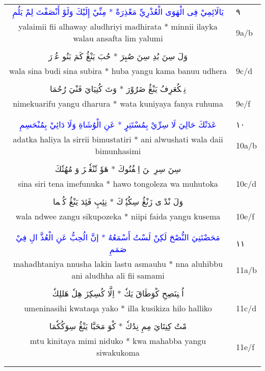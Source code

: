 \documentclass[a4paper, 10pt]{report}
\begin{document}
\begin{longtable}{cl} 

\textcolor{blue}{\textarabic{يَالَائِمِيْ فِى الْهَوَى الْعُذْرِيِّ مَعْذِرَةً * مِنِّيْ إِلَيْكَ وَلَوْ أَنْصَفْتَ لِمْ يَلُمِ}} & \textarabic{٩} \\* 
yalaimii fii alhaway aludhriyi madhirata * minnii ilayka walau ansafta lim yalumi & 9a/b \\* 
\E{ } & \\[2mm] 
\textcolor{mygreen}{\textarabic{وَلَ سِنَ بُدِ سِنَ صُبِرَ * حُبَ يَنْڠُ كَمَ بَنُو عُذٖرَ}} &  \\* 
wala sina budi sina subira * huba yangu kama banuu udhera & 9c/d \\* 
\E{ } & \\[2mm] 
\textcolor{mygreen}{\textarabic{نِمٖكُعَرِفُ يَنْڠُ ضَرُوْرَ * وَتَ كُنِيَايَ فَنْيَ رُحُمَا}} &  \\* 
nimekuarifu yangu dharura * wata kuniyaya fanya ruhuma & 9e/f \\* 
\E{ } & \\[2mm] 
\\[6mm] 

\textcolor{blue}{\textarabic{عَدَتْكَ حَالِيَ لَا سِرِّيْ بِمُسْتَتِرٍ * عَنِ الْوُشَاةِ وَلَا دَائِيْ بِمُنْحَسِمِ}} & \textarabic{١٠} \\* 
adatka haliya la sirrii bimustatiri * ani alwushati wala daii bimunhasimi & 10a/b \\* 
\E{ } & \\[2mm] 
\textcolor{mygreen}{\textarabic{سِنَ سِرِ تٖنَ اِمٖفُنُوكَ * هَوٗ تٗنْڠٗلٖزَ وَ مُهُتٗكَ}} &  \\* 
sina siri tena imefunuka * hawo tongoleza wa muhutoka & 10c/d \\* 
\E{ } & \\[2mm] 
\textcolor{mygreen}{\textarabic{وَلَ نْدْوٖى زَنْڠُ سِكُپٗزٖكَ * نِئِپِ فَئِدَ يَنْڠُ كُسٖما}} &  \\* 
wala ndwee zangu sikupozeka * niipi faida yangu kusema & 10e/f \\* 
\E{ } & \\[2mm] 
\\[6mm] 

\textcolor{blue}{\textarabic{مَحَضْتَنِيَ النُّصْحَ لَكِنْ لَسْتُ أَسْمَعُهُ * إنَّ الُحِبُّ عَنِ الْعُذَّ الِ فِيْ صَمَمِ}} & \textarabic{١١} \\* 
mahadhtaniya nnusha lakin lastu asmauhu * nna aluhibbu ani aludhha ali fii samami & 11a/b \\* 
\E{ } & \\[2mm] 
\textcolor{mygreen}{\textarabic{اُمٖنِنَصِحِ كْوَطَاقَ يَكٗ * اِلَّا كُسِكِزَ هِلٗ هَللِكٗ}} &  \\* 
umeninasihi kwataqa yako * illa kusikiza hilo halliko & 11c/d \\* 
\E{ } & \\[2mm] 
\textcolor{mygreen}{\textarabic{مْتُ كِنِتَايَ مِمِ نِدُكٗ * كْوَ مَحَبَّا يَنْڠُ سِوَكُكٗمَا}} &  \\* 
mtu kinitaya mimi niduko * kwa mahabba yangu siwakukoma & 11e/f \\* 
\E{ } & \\[2mm] 
\\[6mm] 


\end{longtable}
\end{document}
